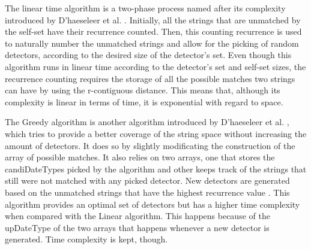 The linear time algorithm is a two-phase process named after its complexity introduced by D'haeseleer et al. \cite{NSADetGen1996}. Initially, all the strings that are unmatched by the self-set have their recurrence counted. Then, this counting recurrence is used to naturally number the unmatched strings and allow for the picking of random detectors, according to the desired size of the detector's set. Even though this algorithm runs in linear time according to the detector's set and self-set sizes, the recurrence counting requires the storage of all the possible matches two strings can have by using the r-contiguous distance. This means that, although its complexity is linear in terms of time, it is exponential with regard to space. 

The Greedy algorithm is another algorithm introduced by D'haeseleer et al. \cite{NSADetGen1996}, which tries to provide a better coverage of the string space without increasing the amount of detectors. It does so by slightly modificating the construction of the array of possible matches. It also relies on two arrays, one that stores the candiDateTypes picked by the algorithm and other keeps track of the strings that still were not matched with any picked detector. New detectors are generated based on the unmatched strings that have the highest recurrence value \cite{ICBook2009}. This algorithm provides an optimal set of detectors but has a higher time complexity when compared with the Linear algorithm. This happens because of the upDateType of the two arrays that happens whenever a new detector is generated. Time complexity is kept, though.








